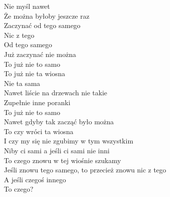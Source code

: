 \begin{text}
    Nie myśl nawet\\
    Że można byłoby jeszcze raz\\
    Zaczynać od tego samego\\
    Nic z tego\\
    Od tego samego\\
    Już zaczynać nie można\\
    To już nie to samo\\
    To już nie ta wiosna\\
    Nie ta sama\\
    Nawet liście na drzewach nie takie\\
    Zupełnie inne poranki\\
    To już nie to samo\\
    Nawet gdyby tak zacząć było można\\
    To czy wróci ta wiosna\\
    I czy my się nie zgubimy w tym wszystkim\\
    Niby ci sami a jeśli ci sami nie inni\\
    To czego znowu w tej wiośnie szukamy\\
    Jeśli znowu tego samego, to przecież znowu nic z tego\\
    A jeśli czegoś innego\\
    To czego?
\end{text}
\begin{chord}

\end{chord}